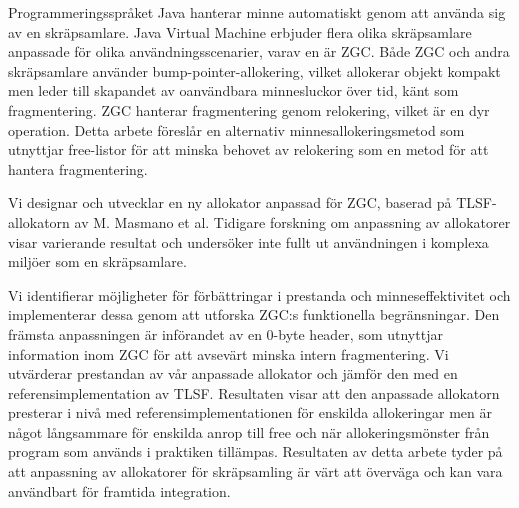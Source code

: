
Programmeringsspråket Java hanterar minne automatiskt genom att använda sig av en skräpsamlare. Java Virtual Machine erbjuder flera olika skräpsamlare anpassade för olika användningsscenarier, varav en är ZGC. Både ZGC och andra skräpsamlare använder bump-pointer-allokering, vilket allokerar objekt kompakt men leder till skapandet av oanvändbara minnesluckor över tid, känt som fragmentering. ZGC hanterar fragmentering genom relokering, vilket är en dyr operation. Detta arbete föreslår en alternativ minnesallokeringsmetod som utnyttjar free-listor för att minska behovet av relokering som en metod för att hantera fragmentering.

Vi designar och utvecklar en ny allokator anpassad för ZGC, baserad på TLSF-allokatorn av M. Masmano et al. Tidigare forskning om anpassning av allokatorer visar varierande resultat och undersöker inte fullt ut användningen i komplexa miljöer som en skräpsamlare.

Vi identifierar möjligheter för förbättringar i prestanda och minneseffektivitet och implementerar dessa genom att utforska ZGC:s funktionella begränsningar. Den främsta anpassningen är införandet av en 0-byte header, som utnyttjar information inom ZGC för att avsevärt minska intern fragmentering. Vi utvärderar prestandan av vår anpassade allokator och jämför den med en referensimplementation av TLSF. Resultaten visar att den anpassade allokatorn presterar i nivå med referensimplementationen för enskilda allokeringar men är något långsammare för enskilda anrop till free och när allokeringsmönster från program som används i praktiken tillämpas. Resultaten av detta arbete tyder på att anpassning av allokatorer för skräpsamling är värt att överväga och kan vara användbart för framtida integration.


